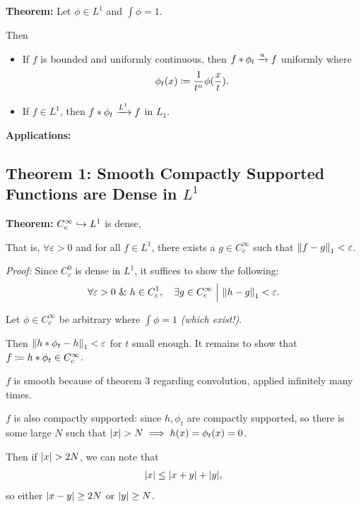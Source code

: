 \textbf{Theorem:} Let \(\phi \in L^1\) and \(\int \phi = 1\).

Then

\begin{itemize}
\item
  If \(f\) is bounded and uniformly continuous, then
  \(f \ast \phi_t \xrightarrow{u} f\) uniformly where
  \begin{align*}
  \phi_t(x) \coloneqq \frac 1 {t^n} \phi(\frac x t)
  .\end{align*}
\item
  If \(f\in L^1\), then \(f \ast \phi_t \xrightarrow{L^1} f\) in \(L_1\).
\end{itemize}

\textbf{Applications:}

\hypertarget{theorem-1-smooth-compactly-supported-functions-are-dense-in-l1}{%
\subsection{\texorpdfstring{Theorem 1: Smooth Compactly Supported
Functions are Dense in
\(L^1\)}{Theorem 1: Smooth Compactly Supported Functions are Dense in L\^{}1}}\label{theorem-1-smooth-compactly-supported-functions-are-dense-in-l1}}

\textbf{Theorem:} \(C_c^\infty \hookrightarrow L^1\) is dense,

That is, \(\forall \varepsilon > 0\) and for all \(f\in L^1\), there
exists a \(g\in C_c^\infty\) such that \({\left\lVert {f - g} \right\rVert}_1 < \varepsilon\).

\emph{Proof:} Since \(C_c^0\) is dense in \(L^1\), it suffices to show
the following:
\begin{align*}
\forall \varepsilon > 0 ~\&~ h \in C_c^1, \quad \exists g\in C_c^\infty {~\mathrel{\Big|}~} {\left\lVert {h - g} \right\rVert}_1 < \varepsilon.
\end{align*}

Let \(\phi \in C_c^\infty\) be arbitrary where \(\int \phi = 1\)
\emph{(which exist!)}.

Then \({\left\lVert {h\ast \phi_t - h} \right\rVert}_1 < \varepsilon\) for \(t\) small enough.
It remains to show that \(f\coloneqq h\ast \phi_t \in C_c^\infty\).

\(f\) is smooth because of theorem 3 regarding convolution, applied
infinitely many times.

\(f\) is also compactly supported: since \(h, \phi_t\) are compactly
supported, so there is some large \(N\) such that
\({\left\lvert {x} \right\rvert} > N \implies h(x) = \phi_t(x) = 0\).

Then if \({\left\lvert {x} \right\rvert} > 2N\), we can note that
\begin{align*}
{\left\lvert {x} \right\rvert} \leq {\left\lvert {x+y} \right\rvert} + {\left\lvert {y} \right\rvert},
\end{align*} so either \({\left\lvert {x-y} \right\rvert}\geq 2N\) or \({\left\lvert {y} \right\rvert} \geq N\).

